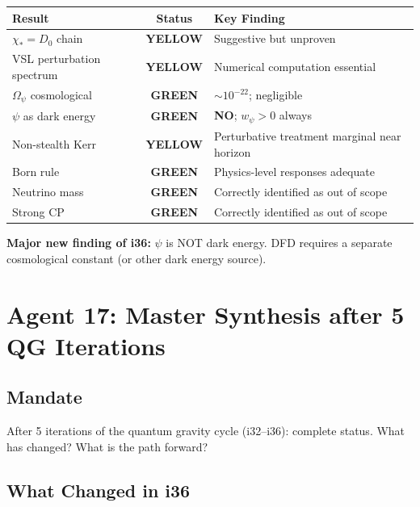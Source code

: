 \documentclass[11pt,a4paper]{article}
\newcommand{\GREEN}{\textcolor{dfdgreen}{\textbf{GREEN}}}
\newcommand{\YELLOW}{\textcolor{dfdyellow}{\textbf{YELLOW}}}
\begin{document}
\begin{center}
\begin{tabular}{lcl}
\toprule
\textbf{Result} & \textbf{Status} & \textbf{Key Finding} \\
\midrule
$\chi_* = D_0$ chain & \YELLOW & Suggestive but unproven \\
VSL perturbation spectrum & \YELLOW & Numerical computation essential \\
$\Omega_\psi$ cosmological & \GREEN & $\sim 10^{-22}$; negligible \\
$\psi$ as dark energy & \GREEN & \textbf{NO}; $w_\psi > 0$ always \\
Non-stealth Kerr & \YELLOW & Perturbative treatment marginal near horizon \\
Born rule & \GREEN & Physics-level responses adequate \\
Neutrino mass & \GREEN & Correctly identified as out of scope \\
Strong CP & \GREEN & Correctly identified as out of scope \\
\bottomrule
\end{tabular}
\end{center}

\textbf{Major new finding of i36:} $\psi$ is NOT dark energy. DFD requires a separate cosmological constant (or other dark energy source).

\newpage
\section{Agent 17: Master Synthesis after 5 QG Iterations}
\label{sec:agent17}

\subsection{Mandate}

After 5 iterations of the quantum gravity cycle (i32--i36): complete status. What has changed? What is the path forward?

\subsection{What Changed in i36}
\end{document}
